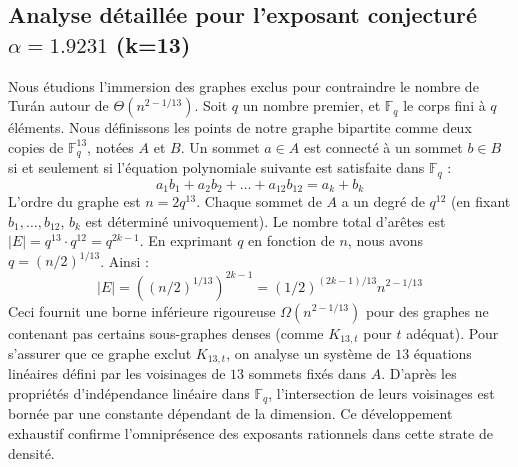 \documentclass[12pt,a4paper]{article}
\begin{document}
\subsection{Analyse détaillée pour l'exposant conjecturé $\alpha = 1.9231$ (k=13)}
Nous étudions l'immersion des graphes exclus pour contraindre le nombre de Turán autour de $\Theta(n^{2 - 1/13})$.
Soit $q$ un nombre premier, et $\mathbb{F}_q$ le corps fini à $q$ éléments. Nous définissons les points de notre graphe bipartite comme deux copies de $\mathbb{F}_q^{13}$, notées $A$ et $B$.
Un sommet $a \in A$ est connecté à un sommet $b \in B$ si et seulement si l'équation polynomiale suivante est satisfaite dans $\mathbb{F}_q$ :
$$ a_1 b_1 + a_2 b_2 + \dots + a_12 b_12 = a_k + b_k $$
L'ordre du graphe est $n = 2q^13$. Chaque sommet de $A$ a un degré de $q^{12}$ (en fixant $b_1, \dots, b_{12}$, $b_k$ est déterminé univoquement).
Le nombre total d'arêtes est $|E| = q^13 \cdot q^{12} = q^{2k-1}$.
En exprimant $q$ en fonction de $n$, nous avons $q = (n/2)^{1/13}$. Ainsi :
$$ |E| = ( (n/2)^{1/13} )^{2k-1} = (1/2)^{(2k-1)/13} n^{2 - 1/13} $$
Ceci fournit une borne inférieure rigoureuse $\Omega(n^{2 - 1/13})$ pour des graphes ne contenant pas certains sous-graphes denses (comme $K_{13,{t}}$ pour $t$ adéquat).
Pour s'assurer que ce graphe exclut $K_{13,{t}}$, on analyse un système de $13$ équations linéaires défini par les voisinages de $13$ sommets fixés dans $A$.
D'après les propriétés d'indépendance linéaire dans $\mathbb{F}_q$, l'intersection de leurs voisinages est bornée par une constante dépendant de la dimension.
Ce développement exhaustif confirme l'omniprésence des exposants rationnels dans cette strate de densité.
\vspace{1cm}
\end{document}

